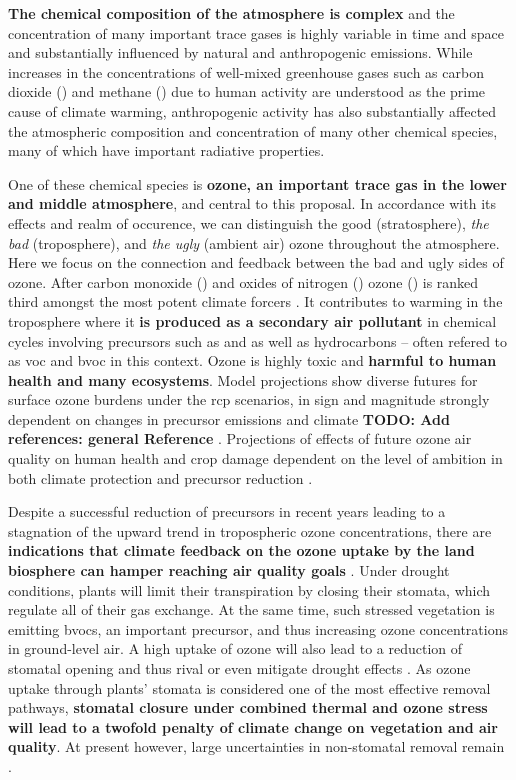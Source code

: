 \textbf{The chemical composition of the atmosphere is complex} and the concentration of many important trace gases is highly variable in time and space and substantially influenced by natural and anthropogenic emissions. While increases in the concentrations of well-mixed greenhouse gases such as carbon dioxide () and methane () due to human activity are understood as the prime cause of climate warming, anthropogenic activity has also substantially affected the atmospheric composition and concentration of many other chemical species, many of which have important radiative properties.

One of these chemical species is \textbf{ozone, an important trace gas in the lower and middle atmosphere}, and central to this proposal. In accordance with its effects and realm of occurence, we can distinguish the good (stratosphere), \emph{the bad} (troposphere), and \emph{the ugly} (ambient air) ozone throughout the atmosphere. Here we focus on the connection and feedback between the bad and ugly sides of ozone. After carbon monoxide () and oxides of nitrogen () ozone () is ranked third amongst the most potent climate forcers \parencite{IPCC2013c8}.
It contributes to warming in the troposphere where it \textbf{is produced as a secondary air pollutant} in chemical cycles involving precursors such as  and  as well as hydrocarbons -- often refered to as \gls{voc} and \gls{bvoc} in this context. Ozone is highly toxic and \textbf{harmful to human health and many ecosystems}. Model projections show diverse futures for surface ozone burdens under the \gls{rcp} scenarios, in sign and magnitude strongly dependent on changes in precursor emissions and climate \textbf{\color{red}TODO: Add references: general Reference} \parencites{JGR:Rieder2015}{AE:Rieder2018}{Nat:Skeie2020}. Projections of effects of future ozone air quality on human health and crop damage dependent on the level of ambition in both climate protection and precursor reduction \parencite{PTRS:Schneidemesser2020}.

Despite a successful reduction of precursors in recent years leading to a stagnation of the upward trend in tropospheric ozone concentrations, there are \textbf{indications that climate feedback on the ozone uptake by the land biosphere can hamper reaching air quality goals} \parencite{NCC:Lin2020}. Under drought conditions, plants will limit their transpiration by closing their stomata, which regulate all of their gas exchange. At the same time, such stressed vegetation is emitting \glspl{bvoc}, an important precursor, and thus increasing ozone concentrations \ch{[O_3]} in ground-level air. A high uptake of ozone will also lead to a reduction of stomatal opening and thus rival or even mitigate drought effects \parencite{BGS:Peron2021}. As ozone uptake through plants’ stomata is considered one of the most effective removal pathways, \textbf{stomatal closure under combined thermal and ozone stress will lead to a twofold penalty of climate change on vegetation and air quality}. At present however, large uncertainties in non-stomatal removal remain \parencite{RG:Clifton2020}.

